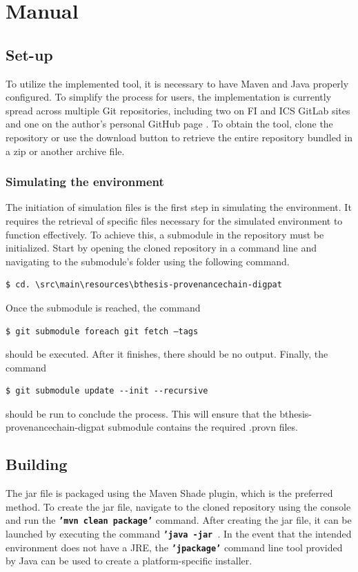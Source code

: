 \documentclass[
  digital,     %
  oneside,     %
  nosansbold,  %
  nocolorbold, %
  lof,         %
  lot,         %
]{fithesis4}
\begin{document}
\chapter{Manual}
\shorthandoff{-}
\section{Set-up}
To utilize the implemented tool, it is necessary to have Maven and Java properly configured. To simplify the process for users, the implementation is currently spread across multiple Git repositories, including two on FI \cite{provchain-fi} and ICS \cite{provchain-ics} GitLab sites and one on the author's personal GitHub page \cite{provchain-github}. To obtain the tool, clone the repository or use the download button to retrieve the entire repository bundled in a zip or another archive file.

\subsection{Simulating the environment}
The initiation of simulation files is the first step in simulating the environment. It requires the retrieval of specific files necessary for the simulated environment to function effectively. To achieve this, a submodule in the repository must be initialized. Start by opening the cloned repository in a command line and navigating to the submodule's folder using the following command.

\begin{verbatim}
$ cd. \src\main\resources\bthesis-provenancechain-digpat  
\end{verbatim}

Once the submodule is reached, the command 

\begin{verbatim}
$ git submodule foreach git fetch –tags
\end{verbatim}

should be executed. After it finishes, there should be no output. Finally, the command

\begin{verbatim}
$ git submodule update --init --recursive  
\end{verbatim}

should be run to conclude the process. This will ensure that the bthesis-provenancechain-digpat submodule contains the required .provn files.

\section{Building}
The jar file is packaged using the Maven Shade plugin, which is the preferred method. To create the jar file, navigate to the cloned repository using the console and run the \textbf{\texttt{'mvn clean package'}} command. After creating the jar file, it can be launched by executing the command \textbf{\texttt{'java -jar }}. In the event that the intended environment does not have a JRE, the \textbf{\texttt{'jpackage'}} command line tool provided by Java can be used to create a platform-specific installer.
\end{document}
